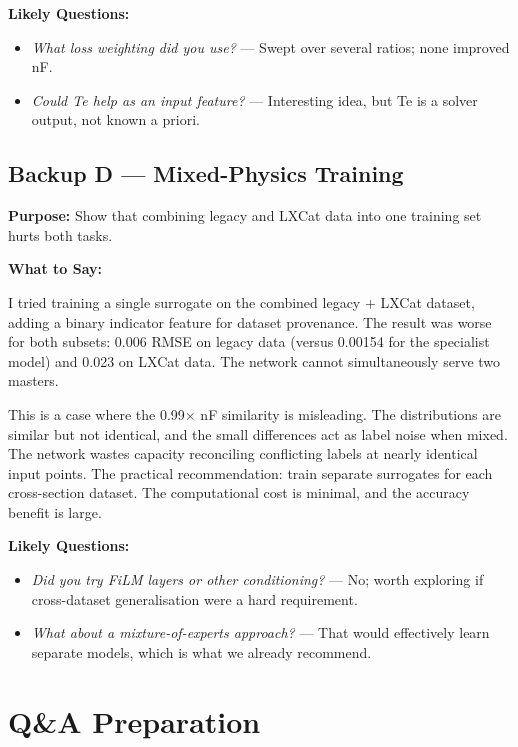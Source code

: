 \documentclass[12pt,a4paper]{article}
\begin{document}
\textbf{Likely Questions:}
\begin{itemize}
  \item \emph{What loss weighting did you use?}
    --- Swept over several ratios; none improved nF.
  \item \emph{Could Te help as an input feature?}
    --- Interesting idea, but Te is a solver output, not known a
    priori.
\end{itemize}

\bigskip

\subsection*{Backup D --- Mixed-Physics Training}

\textbf{Purpose:} Show that combining legacy and LXCat data into
one training set hurts both tasks.

\textbf{What to Say:}

I tried training a single surrogate on the combined legacy + LXCat
dataset, adding a binary indicator feature for dataset provenance.
The result was worse for both subsets: 0.006 RMSE on legacy data
(versus 0.00154 for the specialist model) and 0.023 on LXCat data.
The network cannot simultaneously serve two masters.

This is a case where the 0.99$\times$ nF similarity is misleading.
The distributions are similar but not identical, and the small
differences act as label noise when mixed. The network wastes
capacity reconciling conflicting labels at nearly identical input
points. The practical recommendation: train separate surrogates for
each cross-section dataset. The computational cost is minimal, and
the accuracy benefit is large.

\textbf{Likely Questions:}
\begin{itemize}
  \item \emph{Did you try FiLM layers or other conditioning?}
    --- No; worth exploring if cross-dataset generalisation were
    a hard requirement.
  \item \emph{What about a mixture-of-experts approach?}
    --- That would effectively learn separate models, which is
    what we already recommend.
\end{itemize}

\clearpage

\section*{Q\&A Preparation}
\end{document}
